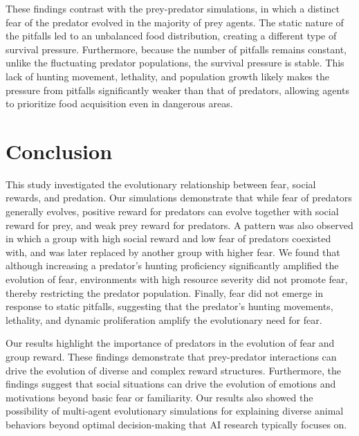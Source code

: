 \documentclass[dvipsnames,format=sigconf]{acmart}
\newcommand{\1}{\mathbb{I} } %
\newcounter{num}
\begin{document}
These findings contrast with the prey-predator simulations, in which a distinct fear of the predator evolved in the majority of prey agents. The static nature of the pitfalls led to an unbalanced food distribution, creating a different type of survival pressure. Furthermore, because the number of pitfalls remains constant, unlike the fluctuating predator populations, the survival pressure is stable. This lack of hunting movement, lethality, and population growth likely makes the pressure from pitfalls significantly weaker than that of predators, allowing agents to prioritize food acquisition even in dangerous areas.

\section{Conclusion}
This study investigated the evolutionary relationship between fear, social rewards, and predation. Our simulations demonstrate that while fear of predators generally evolves,
positive reward for predators can evolve together with social reward for prey, and weak prey reward for predators.
A pattern was also observed in which a group with high social reward and low fear of predators coexisted with, and was later replaced by another group with higher fear. We found that although increasing a predator’s hunting proficiency significantly amplified the evolution of fear, environments with high resource severity did not promote fear, thereby restricting the predator population. Finally, fear did not emerge in response to static pitfalls, suggesting that the predator's hunting movements, lethality, and dynamic proliferation amplify the evolutionary need for fear.

Our results highlight the importance of predators in the evolution of fear and group reward. These findings demonstrate that prey-predator interactions can drive the evolution of diverse and complex reward structures. Furthermore, the findings suggest that social situations can drive the evolution of emotions and motivations beyond basic fear or familiarity. Our results also showed the possibility of multi-agent evolutionary simulations for explaining diverse animal behaviors beyond optimal decision-making that AI research typically focuses on.
\end{document}
